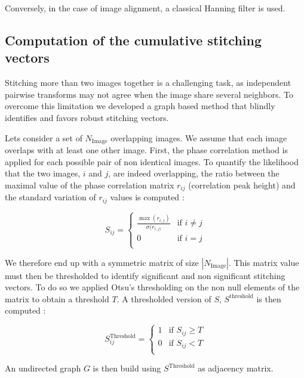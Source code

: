 \documentclass[12pt]{article}
\begin{document}
Conversely, in the case of image alignment, a classical Hanning filter is used.

\subsection{Computation of the cumulative stitching vectors }

Stitching more than two images together is a challenging task, as independent pairwise transforms may not agree when the image share several neighbors. To overcome this limitation we developed a  graph based method that blindly identifies and favors robust stitching vectors.

Lets consider a set of  $N_{\text{Image}}$ overlapping images. We assume that each image overlaps with at least one other image. First, the phase correlation method is applied for each possible pair of non identical images. To quantify the likelihood that the two images, $i$ and $j$, are indeed overlapping, the ratio between the maximal value of the phase correlation matrix $r_{ij}$ (correlation peak height) and the standard variation of $r_{ij}$ values is computed :

\begin{equation}
		S_{ij}  = 
		\begin{cases}
		\frac{\max(r_{i,j})}{\sigma(r_{i,j)}} & \text{if $i \neq j $}\\
		0 & \text{if $i=j$}\\		
		\end{cases}
\end{equation}

We therefore end up with a symmetric matrix of size $|N_{\text{Image}}|$.  This matrix value must then be thresholded to identify significant and non significant stitching vectors. To do so we applied Otsu's thresholding on the non null elements of the matrix to obtain a threshold $T$. A thresholded version of $S$, $S^{\text{threshold}}$  is then computed :

\begin{equation}
		S_{ij}^{\text{Threshold}}  = 
		\begin{cases}
		1 & \text{if $S_{ij} \geq T $}\\
		0 & \text{if $S_{ij} < T$}\\		
		\end{cases}
\end{equation}

An undirected graph $G$ is then build using $S^{\text{Threshold}}$ as adjacency matrix.
\end{document}
